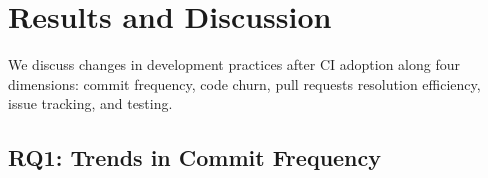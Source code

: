 
\section{Results and Discussion}
\label{sec:results}
We discuss changes in development practices after CI adoption along four 
dimensions: commit frequency, code churn, pull requests resolution efficiency,
issue tracking, and testing. 

%




\subsection{RQ1: Trends in Commit Frequency}

